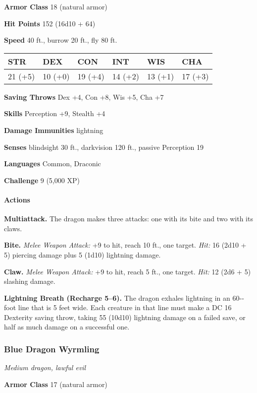 \documentclass[
]{article}
\begin{document}
\textbf{Armor Class} 18 (natural armor)

\textbf{Hit Points} 152 (16d10 + 64)

\textbf{Speed} 40 ft., burrow 20 ft., fly 80 ft.

\begin{longtable}[]{@{}llllll@{}}
\toprule
STR & DEX & CON & INT & WIS & CHA\tabularnewline
\midrule
\endhead
21 (+5) & 10 (+0) & 19 (+4) & 14 (+2) & 13 (+1) & 17 (+3)\tabularnewline
\bottomrule
\end{longtable}

\textbf{Saving Throws} Dex +4, Con +8, Wis +5, Cha +7

\textbf{Skills} Perception +9, Stealth +4

\textbf{Damage Immunities} lightning

\textbf{Senses} blindsight 30 ft., darkvision 120 ft., passive
Perception 19

\textbf{Languages} Common, Draconic

\textbf{Challenge} 9 (5,000 XP)

\hypertarget{actions-29}{%
\paragraph{Actions}\label{actions-29}}

\textbf{Multiattack.} The dragon makes three attacks: one with its bite
and two with its claws.

\textbf{Bite.} \emph{Melee Weapon Attack:} +9 to hit, reach 10 ft., one
target. \emph{Hit:} 16 (2d10 + 5) piercing damage plus 5 (1d10)
lightning damage.

\textbf{Claw.} \emph{Melee Weapon Attack:} +9 to hit, reach 5 ft., one
target. \emph{Hit:} 12 (2d6 + 5) slashing damage.

\textbf{Lightning Breath (Recharge 5--6).} The dragon exhales lightning
in an 60-­‐foot line that is 5 feet wide. Each creature in that line
must make a DC 16 Dexterity saving throw, taking 55 (10d10) lightning
damage on a failed save, or half as much damage on a successful one.

\hypertarget{blue-dragon-wyrmling}{%
\subsubsection{Blue Dragon Wyrmling}\label{blue-dragon-wyrmling}}

\emph{Medium dragon, lawful evil}

\textbf{Armor Class} 17 (natural armor)
\end{document}
